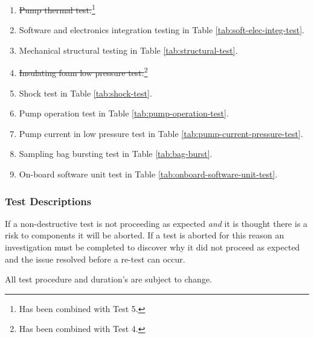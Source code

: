 \begin{enumerate}
    \item \st{Pump thermal test.}\footnote{Has been combined with Test 5.\label{fn:test-combined5}}
    \item Software and electronics integration testing in Table \ref{tab:soft-elec-integ-test}.
    \item Mechanical structural testing in Table \ref{tab:structural-test}.
    \item \st{Insulating foam low pressure test.}\footnote{Has been combined with Test 4.\label{fn:test-combined4}}
    \item Shock test in Table \ref{tab:shock-test}.
    \item Pump operation test in Table \ref{tab:pump-operation-test}.
    \item Pump current in low pressure test in Table \ref{tab:pump-current-pressure-test}.
    \item Sampling bag bursting test in Table \ref{tab:bag-burst}.
    \item On-board software unit test in Table \ref{tab:onboard-software-unit-test}.
\end{enumerate}

\subsubsection{Test Descriptions}

If a non-destructive test is not proceeding as expected \textit{and} it is thought there is a risk to components it will be aborted. If a test is aborted for this reason an investigation must be completed to discover why it did not proceed as expected and the issue resolved before a re-test can occur.

All test procedure and duration's are subject to change.

